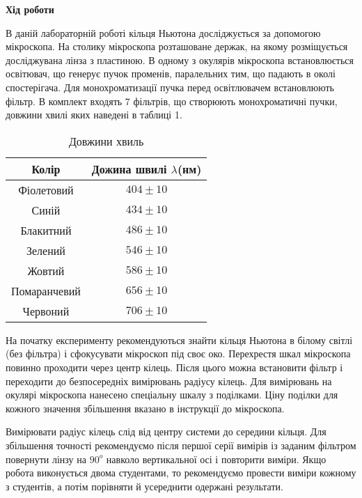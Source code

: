 \begin{center}
    \Large{\textbf{Хід роботи}}    
\end{center}

\vspace{1mm}

В даній лабораторній роботі кільця Ньютона досліджується за допомогою
мікроскопа. На столику мікроскопа розташоване держак, на якому розміщується
досліджувана лінза з пластиною. В одному з окулярів мікроскопа 
встановлюється освітювач, що генерує пучок променів, паралельних тим, що падають в
околі спостерігача. Для монохроматизації пучка перед освітлювачем 
встановлюють фільтр. В комплект входять 7 фільтрів, що створюють монохроматичні
пучки, довжини хвилі яких наведені в таблиці 1.

\begin{table}[h]
    \centering
    \begin{tabular}{ |c|c| }
        \hline
        \textbf{Колір} & \textbf{Дожина швилі $\lambda$(нм)} \\
        \hline
        Фіолетовий & $404 \pm 10$ \\
        \hline
        Синій & $434 \pm 10$ \\
        \hline
        Блакитний  & $486 \pm 10$ \\
        \hline
        Зелений & $546 \pm 10$ \\
        \hline
        Жовтий & $586 \pm 10$ \\
        \hline
        Помаранчевий & $656 \pm 10$ \\
        \hline
        Червоний & $706 \pm 10$ \\
        \hline
    \end{tabular}
    \caption{Довжини хвиль}
\end{table}


На початку експерименту рекомендуються знайти кільця Ньютона в
білому світлі (без фільтра) і сфокусувати мікроскоп 
під своє око. Перехрестя шкал мікроскопа повинно 
проходити через центр кілець. Після цього
можна встановити фільтр і переходити
до безпосередніх вимірювань радіусу
кілець. Для вимірювань на окулярі мікроскопа
нанесено спеціальну шкалу з поділками. Ціну поділки для кожного
значення збільшення вказано в інструкції до мікроскопа.


Вимірювати радіус кілець слід від центру системи до середини кільця.
Для збільшення точності рекомендуємо після першої серії вимірів із заданим
фільтром повернути лінзу на $90^{o}$ навколо вертикальної осі і повторити виміри.
Якщо робота виконується двома студентами, то рекомендуємо провести виміри
кожному з студентів, а потім порівняти й усереднити одержані результати.

